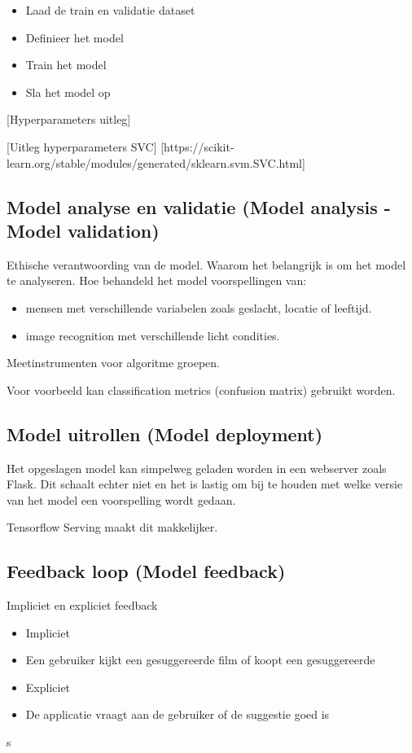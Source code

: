 \begin{itemize}
  \item Laad de train en validatie dataset
  \item Definieer het model
  \item Train het model
  \item Sla het model op
\end{itemize}

[Hyperparameters uitleg]

[Uitleg hyperparameters SVC] [https://scikit-learn.org/stable/modules/generated/sklearn.svm.SVC.html]

\subsection{Model analyse en validatie (Model analysis - Model validation)}\label{subsec:model-analyse-en-validatie}
Ethische verantwoording van de model. Waarom het belangrijk is om het model te analyseren. Hoe behandeld het model voorspellingen van:

\begin{itemize}
  \item mensen met verschillende variabelen zoals geslacht, locatie of leeftijd.
  \item image recognition met verschillende licht condities.
\end{itemize}

Meetinstrumenten voor algoritme groepen.

Voor voorbeeld kan classification metrics (confusion matrix) gebruikt worden.

\subsection{Model uitrollen (Model deployment)}\label{subsec:model-uitrollen}
Het opgeslagen model kan simpelweg geladen worden in een webserver zoals Flask. Dit schaalt echter niet en het is lastig om bij te houden met welke versie van het model een voorspelling wordt gedaan.

Tensorflow Serving maakt dit makkelijker.

\subsection{Feedback loop (Model feedback)}\label{subsec:feebdack-loop}
Impliciet en expliciet feedback

\begin{itemize}
  \item Impliciet
  \item [] Een gebruiker kijkt een gesuggereerde film of koopt een gesuggereerde 
  \item Expliciet
  \item [] De applicatie vraagt aan de gebruiker of de suggestie goed is
\end{itemize}s

